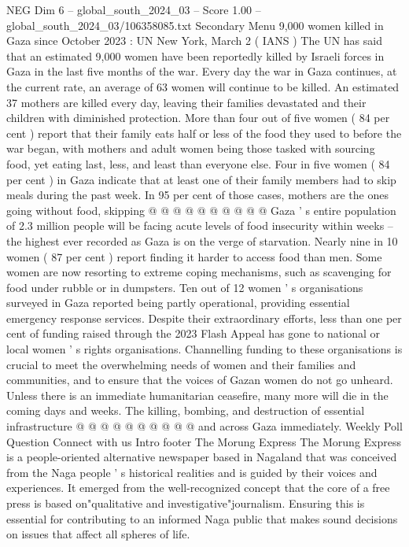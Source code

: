 \begin{textsample}{NEG Dim 6 – global\_south\_2024\_03 – Score 1.00 – global\_south\_2024\_03/106358085.txt}  \label{ex:f6_neg_414}
Secondary Menu 9,000 women killed in Gaza since October 2023 : UN New York, March 2 ( IANS ) The UN has said that an estimated 9,000 women have been reportedly killed by Israeli forces in Gaza in the last five months of the war.
Every day the war in Gaza continues, at the current rate, an average of 63 women will continue to be killed.
An estimated 37 mothers are killed every day, leaving their families devastated and their children with diminished protection.
More than four out of five women ( 84 per cent ) report that their family eats half or less of the food they used to before the war began, with mothers and adult women being those tasked with sourcing food, yet eating last, less, and least than everyone else.
Four in five women ( 84 per cent ) in Gaza indicate that at least one of their family members had to skip meals during the past week.
In 95 per cent of those cases, mothers are the ones going without food, skipping @ @ @ @ @ @ @ @ @ @ Gaza ' s entire population of 2.3 million people will be facing acute levels of food insecurity within weeks -- the highest ever recorded as Gaza is on the verge of starvation.
Nearly nine in 10 women ( 87 per cent ) report finding it harder to access food than men.
Some women are now resorting to extreme coping mechanisms, such as scavenging for food under rubble or in dumpsters.
Ten out of 12 women ' s organisations surveyed in Gaza reported being partly operational, providing essential emergency response services.
Despite their extraordinary efforts, less than one per cent of funding raised through the 2023 Flash Appeal has gone to national or local women ' s rights organisations.
Channelling funding to these organisations is crucial to meet the overwhelming needs of women and their families and communities, and to ensure that the voices of Gazan women do not go unheard.
Unless there is an immediate humanitarian ceasefire, many more will die in the coming days and weeks.
The killing, bombing, and destruction of essential infrastructure @ @ @ @ @ @ @ @ @ @ and across Gaza immediately.
Weekly Poll Question Connect with us Intro footer The Morung Express The Morung Express is a people-oriented alternative newspaper based in Nagaland that was conceived from the Naga people ' s historical realities and is guided by their voices and experiences.
It emerged from the well-recognized concept that the core of a free press is based on"qualitative and investigative"journalism.
Ensuring this is essential for contributing to an informed Naga public that makes sound decisions on issues that affect all spheres of life.

\end{textsample}
